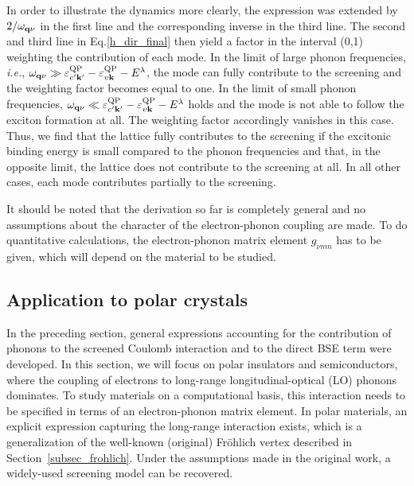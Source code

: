 %
In order to illustrate the dynamics more clearly, the expression was extended by $2/\omega_{\mathbf{q}\nu}$ in the first line and the corresponding inverse in the third line. The second and third line in Eq.\;\eqref{h_dir_final} then yield a factor in the interval (0,1) weighting the contribution of each mode. In the limit of large phonon frequencies, \textit{i.e.}, $ \omega_{\mathbf{q}\nu}\gg\varepsilon^\text{QP}_{c'\mathbf{k'}} - \varepsilon^\text{QP}_{v\mathbf{k}} -  E^\lambda$, the mode can fully contribute to the screening and the weighting factor becomes equal to one. In the limit of small phonon frequencies, $ \omega_{\mathbf{q}\nu}\ll\varepsilon^\text{QP}_{c'\mathbf{k'}} - \varepsilon^\text{QP}_{v\mathbf{k}} -  E^\lambda$ holds and the mode is not able to follow the exciton formation at all.  The weighting factor accordingly vanishes in this case. Thus, we find that the lattice fully contributes to the screening if the excitonic binding energy is small compared to the phonon frequencies and that, in the opposite limit, the lattice does not contribute to the screening at all.  In all other cases, each mode contributes partially to the screening.\par 
It should be noted that the derivation so far is completely general and no assumptions about the character of the electron-phonon coupling are made. To do quantitative calculations, the electron-phonon matrix element $g_{\nu mn}$ has to be given, which will depend on the material to be studied. 


\subsection{Application to polar crystals}\label{pol_ph_sec}
In the preceding section, general expressions accounting for the contribution of phonons to the screened Coulomb interaction and to the direct BSE term were developed.  In this section, we will focus on polar insulators and semiconductors, where the coupling of electrons to long-range longitudinal-optical (LO) phonons dominates. To study materials on a computational basis, this interaction needs to be specified in terms of an electron-phonon matrix element. In polar materials, an explicit expression capturing the long-range interaction exists, which is a generalization of the well-known (original) Fr\"ohlich vertex described in Section~\ref{subsec_frohlich}.  Under the assumptions made in the original work\cite{froehlich}, a widely-used screening model can be recovered.

